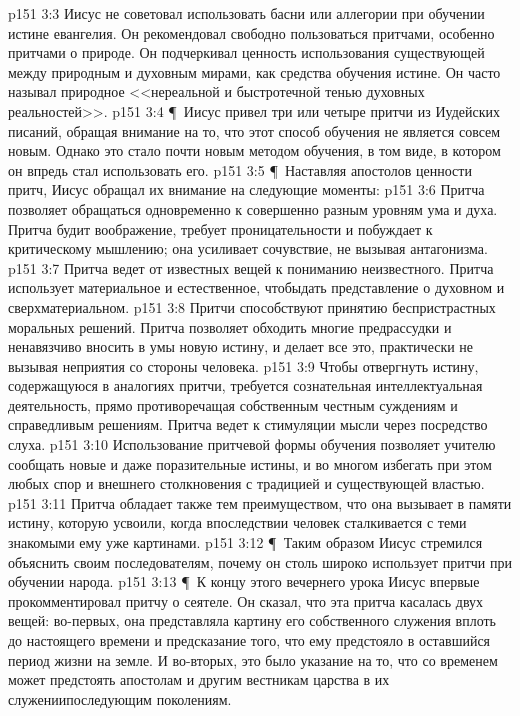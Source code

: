 \vs p151 3:3 \bibnobreakspace Иисус не советовал использовать басни или аллегории при обучении истине евангелия. Он рекомендовал свободно пользоваться притчами, особенно притчами о природе. Он подчеркивал ценность использования  существующей между природным и духовным мирами, как средства обучения истине. Он часто называл природное <<нереальной и быстротечной тенью духовных реальностей>>.
\vs p151 3:4 \P\ \bibnobreakspace Иисус привел три или четыре притчи из Иудейских писаний, обращая внимание на то, что этот способ обучения не является совсем новым. Однако это стало почти новым методом обучения, в том виде, в котором он впредь стал использовать его.
\vs p151 3:5 \P\ \bibnobreakspace Наставляя апостолов ценности притч, Иисус обращал их внимание на следующие моменты:
\vs p151 3:6 Притча позволяет обращаться одновременно к совершенно разным уровням ума и духа. Притча будит воображение, требует проницательности и побуждает к критическому мышлению; она усиливает сочувствие, не вызывая антагонизма.
\vs p151 3:7 Притча ведет от известных вещей к пониманию неизвестного. Притча использует материальное и естественное, чтобыдать представление о духовном и сверхматериальном.
\vs p151 3:8 Притчи способствуют принятию беспристрастных моральных решений. Притча позволяет обходить многие предрассудки и ненавязчиво вносить в умы новую истину, и делает все это, практически не вызывая неприятия со стороны человека.
\vs p151 3:9 Чтобы отвергнуть истину, содержащуюся в аналогиях притчи, требуется сознательная интеллектуальная деятельность, прямо противоречащая собственным честным суждениям и справедливым решениям. Притча ведет к стимуляции мысли через посредство слуха.
\vs p151 3:10 Использование притчевой формы обучения позволяет учителю сообщать новые и даже поразительные истины, и во многом избегать при этом любых спор и внешнего столкновения с традицией и существующей властью.
\vs p151 3:11 Притча обладает также тем преимуществом, что она вызывает в памяти истину, которую усвоили, когда впоследствии человек сталкивается с теми знакомыми ему уже картинами.
\vs p151 3:12 \P\ Таким образом Иисус стремился объяснить своим последователям, почему он столь широко использует притчи при обучении народа.
\vs p151 3:13 \P\ К концу этого вечернего урока Иисус впервые прокомментировал притчу о сеятеле. Он сказал, что эта притча касалась двух вещей: во\hyp{}первых, она представляла картину его собственного служения вплоть до настоящего времени и предсказание того, что ему предстояло в оставшийся период жизни на земле. И во\hyp{}вторых, это было указание на то, что со временем может предстоять апостолам и другим вестникам царства в их служениипоследующим поколениям.
